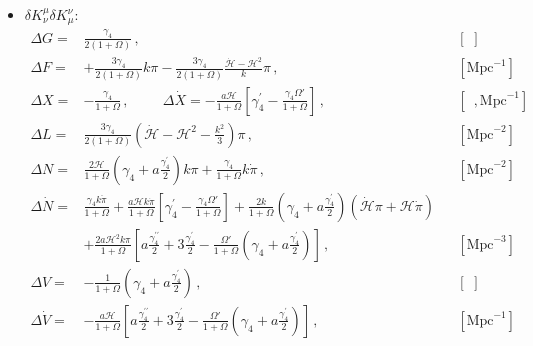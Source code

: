 \documentclass[prd,nofootinbib,showpacs]{revtex4}
\def\l{\left}
\def\r{\right}
\def\f{\frac}
\def\hub{{\mathcal H}}
\begin{document}
{\begin{itemize}
{\begin{align}
%
&\Delta{ M}= \gamma_3\l(3\hub^2-3\dot{\hub}+k^2\r)\dot{\pi}+\gamma_3 \l(6\hub^3-3\ddot{\hub} \r)\pi +2\hub k^2\pi\l(\gamma_3+a\f{\gamma_3^\prime}{2}\r) -6a\hub(\dot{\hub}-\hub^2)\f{\gamma_3^\prime}{2}\pi \, , & &  [\text{Mpc}^{-3}] \,\nonumber\\
%
& \Delta{ Y}= \f{3}{2(1+\Omega)}\l( \gamma_3+a\f{\gamma_3^\prime}{2}\r) \, , & &  [\,\,] \,\nonumber\\
%
&\Delta{ U}=\f{3}{2}\f{\gamma_3}{1+\Omega} \, . & &  [\,\,] \,
\end{align}}
%
\item[] \underline{$\delta K^\mu_\nu\delta K^\nu_\mu$}:\\
{\small
\begin{align} \label{Eq:ContribGamma4}
%
\Delta{ G} =& \f{\gamma_4}{2(1+\Omega)} \, , & &  [\,\,]  \, \nonumber \\
%
\Delta{ F} =& +\f{3\gamma_4}{2(1+\Omega)}k\pi-\f{3\gamma_4 }{2(1+\Omega)}\f{\dot{\hub}-\hub^2}{k}\pi \, ,& &  [\text{Mpc}^{-1}] \,\nonumber\\
%
\Delta{ X} =& -\f{\gamma_4}{1+\Omega} \,,\hspace{1cm} \Delta\dot{X}=-\f{a\hub}{1+\Omega}\l[\gamma_4^\prime-\f{\gamma_4\Omega'}{1+\Omega} \r] \, , & &  [\,\,\,, \text{Mpc}^{-1}]  \, \nonumber \\
%
\Delta{ L} =& \f{3\gamma_4}{2(1+\Omega)}\l(\dot{\hub}-\hub^2-\f{k^2}{3}\r)\pi \, , & &  [\text{Mpc}^{-2}] \,\nonumber\\
%
\Delta{ N} =& \f{2 \hub}{1+\Omega}\l(\gamma_4+a\f{\gamma_4^\prime}{2} \r)k\pi + \f{\gamma_4}{1+\Omega}k\dot{\pi}\, , & &  [\text{Mpc}^{-2}] \,\nonumber\\
%
\Delta\dot{N} =& \f{\gamma_4k\ddot{\pi}}{1+\Omega} +\f{a\hub k\dot{\pi}}{1+\Omega}\l[\gamma_4^\prime-\f{\gamma_4\Omega'}{1+\Omega} \r] +\f{2k}{1+\Omega}\l(\gamma_4+a\f{\gamma_4^\prime}{2} \r)\l( \dot{\hub}\pi + \hub \dot{\pi} \r) \nonumber\\
& +\f{2a\hub^2k\pi}{1+\Omega}\l[a \f{\gamma_4^{\prime\prime}}{2}+3\f{\gamma_4^\prime}{2}-\f{\Omega'}{1+\Omega}\l(\gamma_4+a\f{\gamma_4^\prime}{2} \r) \r] \, ,& &  [\text{Mpc}^{-3}]  \, \nonumber \\
%
\Delta{ V} =& -\f{1}{1+\Omega}\l(\gamma_4+a\f{\gamma_4^\prime}{2} \r) \, ,& &  [\,\,]  \, \nonumber \\
%
\Delta\dot{V} =& -\f{a\hub}{1+\Omega}\l[a\f{\gamma_4^{\prime\prime}}{2} +3\f{\gamma_4^\prime}{2}-\f{\Omega'}{1+\Omega}\l(\gamma_4+a\f{\gamma_4^\prime}{2} \r) \r] \, , & &  [\text{Mpc}^{-1}]  \, \nonumber \\

\end{align}}
\end{itemize}}
\end{document}
